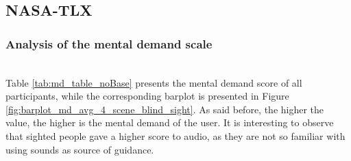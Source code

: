 \subsection{NASA-TLX}
\label{subsubsec:results_nasa_tlx_2}

\subsubsection{Analysis of the mental demand scale}\mbox{}\\

Table \ref{tab:md_table_noBase} presents the mental demand score of all participants, while the corresponding barplot is presented in Figure \ref{fig:barplot_md_avg_4_scene_blind_sight}. As said before, the higher the value, the higher is the mental demand of the user. It is interesting to observe that sighted people gave a higher score to audio, as they are not so familiar with using sounds as source of guidance.



